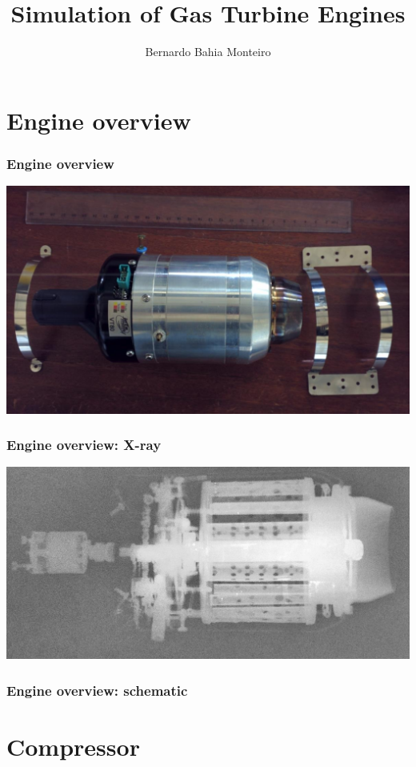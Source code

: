 \documentclass{beamer}
\title{Simulation of Gas Turbine Engines}
\author{Bernardo Bahia Monteiro}
\begin{document}
\maketitle
\tableofcontents

\clearpage

\section{Engine overview}
{
\begin{frame}
\frametitle{Engine overview}
\includegraphics[width=\textwidth]{fig/JetsMuntVT-80.jpg}
\end{frame}

\begin{frame}
\frametitle{Engine overview: X-ray}
\includegraphics[width=\textwidth]{fig/JetsMuntVT-80X-ray_enhanced_invert.jpg}
\end{frame}
}
\begin{frame}
\frametitle{Engine overview: schematic}

\end{frame}

\section{Compressor}
\end{document}
